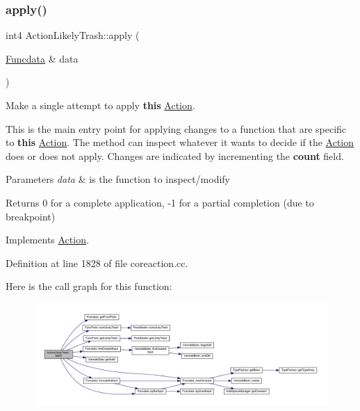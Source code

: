 \subsubsection{\texorpdfstring{apply()}{apply()}}
{\footnotesize\ttfamily int4 Action\+Likely\+Trash\+::apply (\begin{DoxyParamCaption}\item[{\mbox{\hyperlink{class_funcdata}{Funcdata}} \&}]{data }\end{DoxyParamCaption})\hspace{0.3cm}{\ttfamily [virtual]}}



Make a single attempt to apply {\bfseries{this}} \mbox{\hyperlink{class_action}{Action}}. 

This is the main entry point for applying changes to a function that are specific to {\bfseries{this}} \mbox{\hyperlink{class_action}{Action}}. The method can inspect whatever it wants to decide if the \mbox{\hyperlink{class_action}{Action}} does or does not apply. Changes are indicated by incrementing the {\bfseries{count}} field. 
\begin{DoxyParams}{Parameters}
{\em data} & is the function to inspect/modify \\
\hline
\end{DoxyParams}
\begin{DoxyReturn}{Returns}
0 for a complete application, -\/1 for a partial completion (due to breakpoint) 
\end{DoxyReturn}


Implements \mbox{\hyperlink{class_action_aac1c3999d6c685b15f5d9765a4d04173}{Action}}.



Definition at line 1828 of file coreaction.\+cc.

Here is the call graph for this function\+:
\nopagebreak
\begin{figure}[H]
\begin{center}
\leavevmode
\includegraphics[width=350pt]{class_action_likely_trash_afbd2ec1783db1f08cedf5b259304f158_cgraph}
\end{center}
\end{figure}
\mbox{\label{class_action_likely_trash_ad0d1990ca8b2b48d5d88d757b3664560}} 
